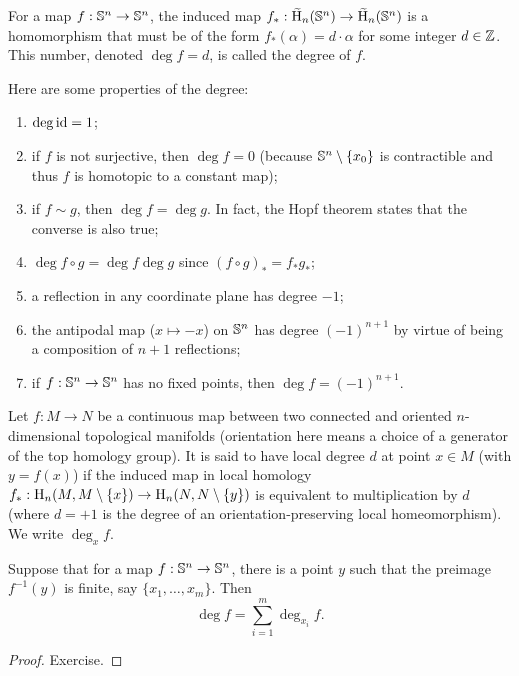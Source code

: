 \begin{defn}\label{Degree}
    For a map $f:\mathbb{S}^n\to \mathbb{S}^n$, the induced map $f_\ast:\wt{\rmH}_n(\bbS^n)\to \wt{\rmH}_n(\bbS^n)$ is a homomorphism that must be of the form $f_\ast(\alpha)=d\cdot \alpha$ for some integer $d\in\mathbb{Z}$. This number, denoted $\deg f=d$, is called the degree of $f$.
\end{defn}
Here are some properties of the degree:
\begin{enumerate}
    \item $\deg\operatorname{id}=1$;
    \item if $f$ is not surjective, then $\deg f=0$ (because $\mathbb{S}^n\setminus\{x_0\}$ is contractible and thus $f$ is homotopic to a constant map);
    \item if $f\sim g$, then $\deg f=\deg g$. In fact, the Hopf theorem states that the converse is also true;
    \item $\deg f\circ g=\deg f\deg g$ since $(f\circ g)_\ast=f_\ast g_\ast $;
    \item a reflection in any coordinate plane has degree $-1$;
    \item the antipodal map ($x\mapsto -x$) on $\mathbb{S}^n$ has degree $(-1)^{n+1}$ by virtue of being a composition of $n+1$ reflections;
    \item if $f:\mathbb{S}^n\to \mathbb{S}^n$ has no fixed points, then $\deg f=(-1)^{n+1}$.
\end{enumerate}


\begin{defn}
    Let $f:M\to N$ be a continuous map between two connected and oriented $n$-dimensional topological manifolds (orientation here means a choice of a generator of the top homology group). It is said to have local degree $d$ at point $x\in M$ (with $y=f(x)$) if the induced map in local homology $f_\ast:\mathrm{H}_n(M,M\setminus\{x\})\to \mathrm{H}_n(N,N\setminus\{y\})$ is equivalent to multiplication by $d$ (where $d=+1$ is the degree of an orientation-preserving local homeomorphism). We write $\deg_x f$.
\end{defn}

\begin{prop}\label{prop local degree formula}
    Suppose that for a map $f:\mathbb{S}^n\to \mathbb{S}^n$, there is a point $y$ such that the preimage $f^{-1}(y)$ is finite, say $\{x_1,\ldots,x_m\}$. Then \[\deg f=\sum_{i=1}^m \deg_{x_i} f.\]
\end{prop}
\begin{proof}
     Exercise.
\end{proof}

